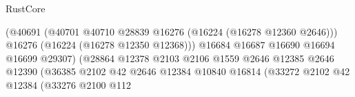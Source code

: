 \begin{lexlean}{RustCore}
\begin{coremodule}
                                                              (@40691
                                                                (@40701
                                                                  @40710
                                                                  @28839
                                                                  @16276
                                                                  (@16224 (@16278 @12360 @2646)))
                                                                @16276
                                                                (@16224 (@16278 @12350 @12368)))
                                                              @16684
                                                              @16687
                                                              @16690
                                                              @16694
                                                              @16699
                                                              @29307)
                                                            (@28864
                                                              @12378
                                                              @2103
                                                              @2106
                                                              @1559
                                                              @2646
                                                              @12385
                                                              @2646
                                                              @12390
                                                              (@36385
                                                                @2102
                                                                @42
                                                                @2646
                                                                @12384
                                                                @10840
                                                                @16814
                                                                (@33272
                                                                  @2102
                                                                  @42
                                                                  @12384
                                                                  (@33276
                                                                    @2100
                                                                    @112

\end{coremodule}
\end{lexlean}
